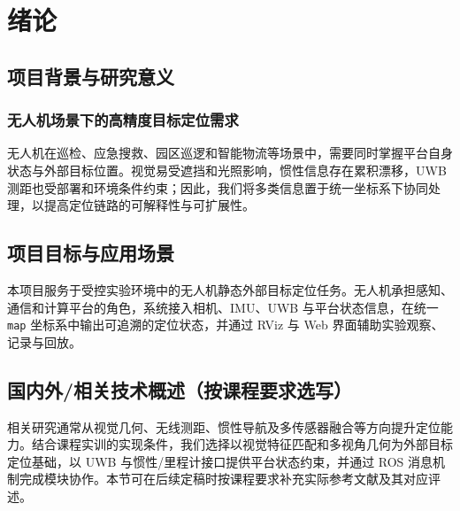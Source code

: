 \documentclass[UTF8,a4paper,12pt]{ctexart}
\begin{document}
\begin{abstract}
\noindent\textbf{研究问题与项目目标：} 本报告面向无人机场景下的高精度外部静态目标定位需求，关注平台自身状态与外部目标位置如何在复杂环境中协同表达。我们的目标是构建一条从多源感知接入、坐标统一和融合估计，到可视化展示与实验归档的原型链路，并始终保持定位系统不直接干预飞行控制的安全边界。

\noindent\textbf{系统方案与核心工作：} 系统以机载视觉、UWB 测距、惯性信息和平台状态为输入，通过 ROS 消息接口衔接硬件与算法模块；视觉部分围绕目标检测、SuperPoint 特征和 LightGlue 匹配开展复现与接入，平台侧以 UWB 等信息提供定位约束，最终在统一 \texttt{map} 坐标系中管理目标状态、质量信息和历史轨迹。

\noindent\textbf{验证方式与主要结论：} 我们采用软件测试、真实传感器数据采集与明确假设下的拟合仿真相结合的方式开展验证，并将三类证据分别呈现。现有结果支持软件主链路及部分真实传感器采集能力已获得验证；拟合仿真可用于分析误差分布变化，但尚不能替代实机端到端定位精度、实时性和稳定性的验收结论。

\noindent\textbf{关键词：} 无人机；目标定位；多传感器融合；UWB；机器视觉；ROS2
\end{abstract}
\clearpage
{}

\section{绪论}
\subsection{项目背景与研究意义}
\subsubsection{无人机场景下的高精度目标定位需求}
无人机在巡检、应急搜救、园区巡逻和智能物流等场景中，需要同时掌握平台自身状态与外部目标位置。视觉易受遮挡和光照影响，惯性信息存在累积漂移，UWB 测距也受部署和环境条件约束；因此，我们将多类信息置于统一坐标系下协同处理，以提高定位链路的可解释性与可扩展性。

\subsection{项目目标与应用场景}
本项目服务于受控实验环境中的无人机静态外部目标定位任务。无人机承担感知、通信和计算平台的角色，系统接入相机、IMU、UWB 与平台状态信息，在统一 \texttt{map} 坐标系中输出可追溯的定位状态，并通过 RViz 与 Web 界面辅助实验观察、记录与回放。

\subsection{国内外/相关技术概述（按课程要求选写）}
相关研究通常从视觉几何、无线测距、惯性导航及多传感器融合等方向提升定位能力。结合课程实训的实现条件，我们选择以视觉特征匹配和多视角几何为外部目标定位基础，以 UWB 与惯性/里程计接口提供平台状态约束，并通过 ROS 消息机制完成模块协作。本节可在后续定稿时按课程要求补充实际参考文献及其对应评述。
\end{document}
